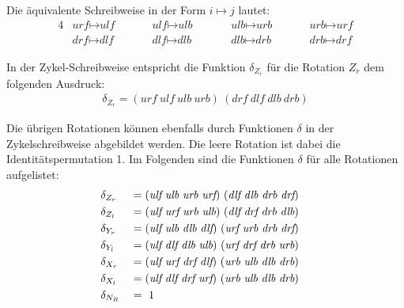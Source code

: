\documentclass[12pt,a4paper, usenames, dvipsnames]{article}
\theoremstyle{mystyle}
\theoremstyle{definition}
\begin{document}
Die äquivalente Schreibweise in der Form $i \mapsto j$ lautet: 
\begin{alignat*}{4}
& \textit{urf} \mapsto \textit{ulf} \ \ \ \ \ \ \ \ && \textit{ulf} \mapsto \textit{ulb} \ \ \ \ \ \ \ \ && \textit{ulb} \mapsto \textit{urb} \ \ \ \ \ \ \ \ && \textit{urb} \mapsto \textit{urf} \\
& \textit{drf} \mapsto \textit{dlf} \ \ \ \ \ \ \ \ && \textit{dlf} \mapsto \textit{dlb} \ \ \ \ \ \ \ \ \ && \textit{dlb} \mapsto \textit{drb} \ \ \ \ \ \ \ \ && \textit{drb} \mapsto \textit{drf}
\end{alignat*}

In der Zykel-Schreibweise entspricht die Funktion $\delta_{Z_r}$ für die Rotation $Z_r$ dem folgenden Ausdruck:
\begin{align*}
\delta_{Z_r}=( \textit{urf} \ \textit{ulf} \ \textit{ulb} \ \textit{urb} )\ ( \textit{drf} \ \textit{dlf} \ \textit{dlb} \ \textit{drb}  )
\end{align*}
 

Die übrigen Rotationen können ebenfalls durch Funktionen $\delta$ in der Zykelschreibweise abgebildet werden. Die leere Rotation ist dabei die Identitätspermutation 1. Im Folgenden sind die Funktionen $\delta$ für alle Rotationen aufgelistet:
\begin{alignat*}{2}
& \delta_{Z_r} && = ( \textit{ulf} \ \textit{ulb} \ \textit{urb} \ \textit{urf})\ (\textit{dlf} \ \textit{dlb} \ \textit{drb} \ \textit{drf} )\\
& \delta_{Z_l} && = ( \textit{ulf} \ \textit{urf} \ \textit{urb} \ \textit{ulb})\ (\textit{dlf} \ \textit{drf} \ \textit{drb} \ \textit{dlb} )\\
& \delta_{Y_r} && = ( \textit{ulf} \ \textit{ulb} \ \textit{dlb} \ \textit{dlf})\ ( \textit{urf} \ \textit{urb} \ \textit{drb} \ \textit{drf} )\\
& \delta_{Y_l} && = ( \textit{ulf} \ \textit{dlf} \ \textit{dlb} \ \textit{ulb})\ ( \textit{urf} \ \textit{drf} \ \textit{drb} \ \textit{urb} )\\
& \delta_{X_r} && = ( \textit{ulf} \ \textit{urf} \ \textit{drf} \ \textit{dlf})\ ( \textit{urb} \ \textit{ulb} \ \textit{dlb} \ \textit{drb} )\\
& \delta_{X_l} && = ( \textit{ulf} \ \textit{dlf} \ \textit{drf} \ \textit{urf})\ (\textit{urb} \ \textit{ulb} \ \textit{dlb} \ \textit{drb} )\\
& \delta_{N_R} && = \ 1 \hspace*{14.1em}
\end{alignat*}
\end{document}
